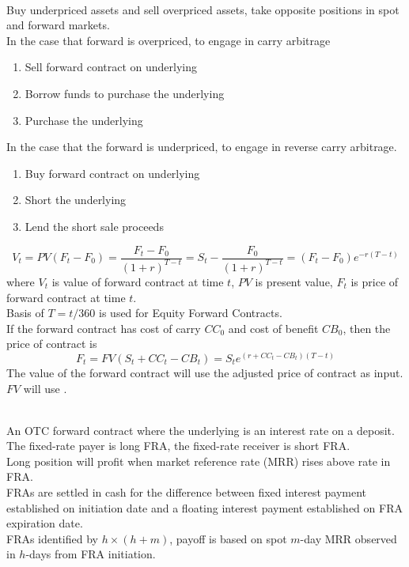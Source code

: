 \begin{remark} \\
Buy underpriced assets and sell overpriced assets, take opposite positions in spot and forward markets.\\
In the case that forward is overpriced, to engage in carry arbitrage
\begin{enumerate}[label=\roman*.]
\setlength{\itemsep}{0pt}
\item Sell forward contract on underlying
\item Borrow funds to purchase the underlying
\item Purchase the underlying
\end{enumerate}
In the case that the forward is underpriced, to engage in reverse carry arbitrage.
\begin{enumerate}[label=\roman*.]
\setlength{\itemsep}{0pt}
\item Buy forward contract on underlying
\item Short the underlying
\item Lend the short sale proceeds
\end{enumerate}
\end{remark}

\begin{remark} 
\begin{equation}
V_t = PV(F_t - F_0) = \frac{F_t - F_0}{(1+r)^{T-t}} = S_t - \frac{F_0}{(1+r)^{T-t}} = (F_t - F_0)e^{-r(T-t)} \nonumber
\end{equation}
where $V_t$ is value of forward contract at time $t$, $PV$ is present value, $F_t$ is price of forward contract at time $t$.\\
Basis of $T = t/360$ is used for Equity Forward Contracts.\\
If the forward contract has cost of carry $CC_0$ and cost of benefit $CB_0$, then the price of contract is
\begin{equation}
F_t = FV(S_t + CC_t - CB_t) = S_t e^{(r + CC_t - CB_t)(T-t)}\nonumber
\end{equation}
The value of the forward contract will use the adjusted price of contract as input.\\
$FV$ will use .
\end{remark}

\begin{remark} \\
An OTC forward contract where the underlying is an interest rate on a deposit.\\
The fixed-rate payer is long FRA, the fixed-rate receiver is short FRA.\\
Long position will profit when market reference rate (MRR) rises above rate in FRA.\\
FRAs are settled in cash for the difference between fixed interest payment established on initiation date and a floating interest payment established on FRA expiration date.\\
FRAs identified by $h \times (h+m)$, payoff is based on spot $m$-day MRR observed in $h$-days from FRA initiation.
\end{remark}

